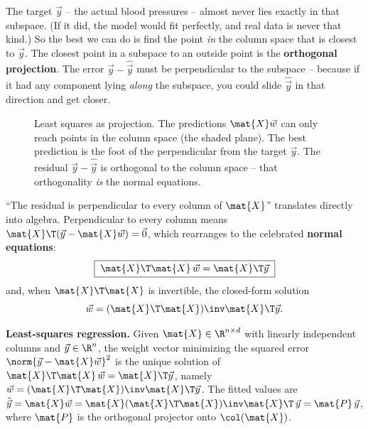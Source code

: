 The target $\vec{y}$ -- the actual blood pressures -- almost never lies exactly in that
subspace. (If it did, the model would fit perfectly, and real data is never that kind.)
So the best we can do is find the point \emph{in} the column space that is closest to
$\vec{y}$. The closest point in a subspace to an outside point is the \textbf{orthogonal
projection}. The error $\vec{y} - \hat{\vec{y}}$ must be perpendicular to the subspace --
because if it had any component lying \emph{along} the subspace, you could slide
$\hat{\vec{y}}$ in that direction and get closer.

\begin{figure}[H]
\centering
{}
\caption{Least squares as projection. The predictions $\mat{X}\vec{w}$ can only reach
points in the column space (the shaded plane). The best prediction is the foot of the
perpendicular from the target $\vec{y}$. The residual $\vec{y}-\hat{\vec{y}}$ is
orthogonal to the column space -- that orthogonality \emph{is} the normal equations.}
\label{ch34:fig-projection}
\end{figure}

``The residual is perpendicular to every column of $\mat{X}$'' translates directly into
algebra. Perpendicular to every column means $\mat{X}\T(\vec{y}-\mat{X}\vec{w}) = \vec{0}$,
which rearranges to the celebrated \textbf{normal equations}:
\[
\boxed{\;\mat{X}\T\mat{X}\,\vec{w} = \mat{X}\T\vec{y}\;}
\]
and, when $\mat{X}\T\mat{X}$ is invertible, the closed-form solution
\[
\vec{w} = (\mat{X}\T\mat{X})\inv \mat{X}\T \vec{y}.
\]

\begin{formalbox}
\textbf{Least-squares regression.} Given $\mat{X}\in\R^{n\times d}$ with linearly
independent columns and $\vec{y}\in\R^{n}$, the weight vector minimizing the squared
error $\norm{\vec{y}-\mat{X}\vec{w}}^2$ is the unique solution of
$\mat{X}\T\mat{X}\,\vec{w}=\mat{X}\T\vec{y}$, namely
$\vec{w}=(\mat{X}\T\mat{X})\inv\mat{X}\T\vec{y}$. The fitted values are
$\hat{\vec{y}} = \mat{X}\vec{w} = \mat{X}(\mat{X}\T\mat{X})\inv\mat{X}\T\,\vec{y} =
\mat{P}\,\vec{y}$, where $\mat{P}$ is the orthogonal projector onto $\col(\mat{X})$.
\end{formalbox}

